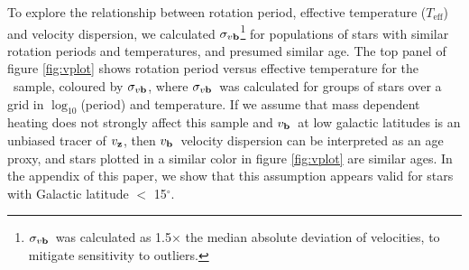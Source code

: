 \documentclass{aastex63}
\newcommand{\teff}{$T_{\mathrm{eff}}$}
\newcommand{\degrees}{$^\circ$}
\newcommand{\vz}{$v_{\bf z}$}
\newcommand{\vb}{$v_{\bf b}$}
\newcommand{\sigmavb}{$\sigma_{v{\bf b}}$}
\newcommand{\mct}{\citet{mcquillan2014}}
\begin{document}
To explore the relationship between rotation period, effective temperature
(\teff ) and velocity dispersion, we calculated \sigmavb \footnote{\sigmavb\
was calculated as 1.5$\times$ the median absolute deviation of velocities, to
mitigate sensitivity to outliers.} for populations of stars with similar
rotation periods and temperatures, and presumed similar age.
The top panel of figure \ref{fig:vplot} shows rotation period versus effective
temperature for the \mct\ sample, coloured by \sigmavb, where \sigmavb\ was
calculated for groups of stars over a grid in $\log_{10}$(period) and
temperature.
If we assume that mass dependent heating does not strongly affect this sample
and \vb\ at low galactic latitudes is an unbiased tracer of \vz, then \vb\
velocity dispersion can be interpreted as an age proxy, and stars plotted in a
similar color in figure \ref{fig:vplot} are similar ages.
In the appendix of this paper, we show that this assumption appears valid for
stars with Galactic latitude $<$ 15\degrees.
\end{document}
